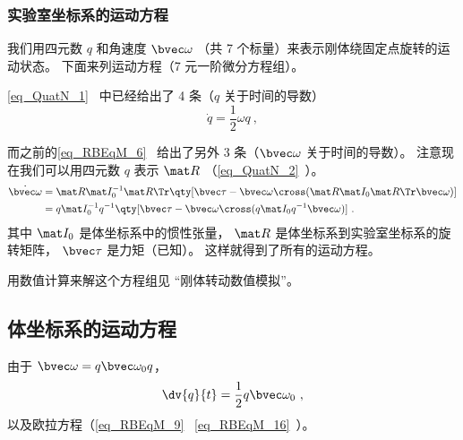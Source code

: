 
\begin{issues}
\issueAbstract
\end{issues}


\subsubsection{实验室坐标系的运动方程}
我们用四元数 $q$ 和角速度 $\bvec \omega$ （共 7 个标量）来表示刚体绕固定点旋转的运动状态。 下面来列运动方程（7 元一阶微分方程组）。

\autoref{eq_QuatN_1}~ 中已经给出了 4 条（$q$ 关于时间的导数）
\begin{equation}
\dot{q} = \frac12 \omega q~,
\end{equation}

而之前的\autoref{eq_RBEqM_6}~ 给出了另外 3 条（$\bvec\omega$ 关于时间的导数）。 注意现在我们可以用四元数 $q$ 表示 $\mat R$ （\autoref{eq_QuatN_2}~）。
\begin{equation}
\begin{aligned}
\dot{\bvec \omega} &= \mat R \mat I_0^{-1} \mat R\Tr \qty[\bvec \tau  - \bvec\omega\cross(\mat R \mat I_0 \mat R\Tr \bvec\omega)]\\
&= q \mat I_0^{-1} q^{-1} \qty[\bvec \tau  - \bvec\omega\cross(q \mat I_0 q^{-1}\bvec\omega)]~.
\end{aligned}
\end{equation}
其中 $\mat I_0$ 是体坐标系中的惯性张量， $\mat R$ 是体坐标系到实验室坐标系的旋转矩阵， $\bvec\tau$ 是力矩（已知）。 这样就得到了所有的运动方程。

用数值计算来解这个方程组见 “刚体转动数值模拟”。

\subsection{体坐标系的运动方程}
由于 $\bvec\omega = q\bvec\omega_0 q$，
\begin{equation}
\dv{q}{t} = \frac12 q \bvec \omega_0~,
\end{equation}
以及欧拉方程（\autoref{eq_RBEqM_9}~ \autoref{eq_RBEqM_16}~）。
